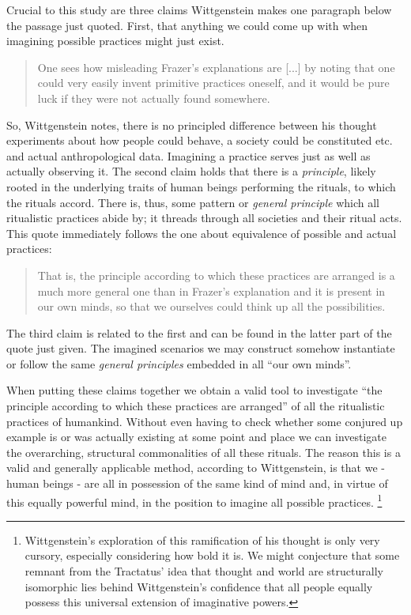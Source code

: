 \documentclass{article}
\begin{document}
Crucial to this study are three claims Wittgenstein makes one paragraph below the passage just quoted. First, that anything we could come up with when imagining possible practices might just exist.
\begin{quote}
One sees how misleading Frazer's explanations are [...] by noting that one could very easily invent primitive practices oneself, and it would be pure luck if they were not actually found somewhere. %
\end{quote} 
So, Wittgenstein notes, there is no principled difference between his thought experiments about how people could behave, a society could be constituted etc. and actual anthropological data. Imagining a practice serves just as well as actually observing it.
The second claim holds that there is a \textit{principle}, likely rooted in the underlying traits of human beings performing the rituals, to which the rituals accord. There is, thus, some pattern or \textit{general principle} which all ritualistic practices abide by; it threads through all societies and their ritual acts. This quote immediately follows the one about equivalence of possible and actual practices:
\begin{quote}
That is, the principle according to which these practices are arranged is a much more general one than in Frazer's explanation and it is present in our own minds, so that we ourselves could think up all the possibilities. %
\end{quote} 
The third claim is related to the first and can be found in the latter part of the quote just given. The imagined scenarios we may construct somehow instantiate or follow the same \textit{general principles} embedded in all ``our own minds''.

When putting these claims together we obtain a valid tool to investigate ``the principle according to which these practices are arranged'' of all the ritualistic practices of humankind. Without even having to check whether some conjured up example is or was actually existing at some point and place we can investigate the overarching, structural commonalities of all these rituals. The reason this is a valid and generally applicable method, according to Wittgenstein, is that we - human beings - are all in possession of the same kind of mind and, in virtue of this equally powerful mind, in the position to imagine all possible practices.
\footnote{Wittgenstein's exploration of this ramification of his thought is only very cursory, especially considering how bold it is. We might conjecture that some remnant from the Tractatus' idea that thought and world are structurally isomorphic lies behind Wittgenstein's confidence that all people equally possess this universal extension of imaginative powers.}
\end{document}
